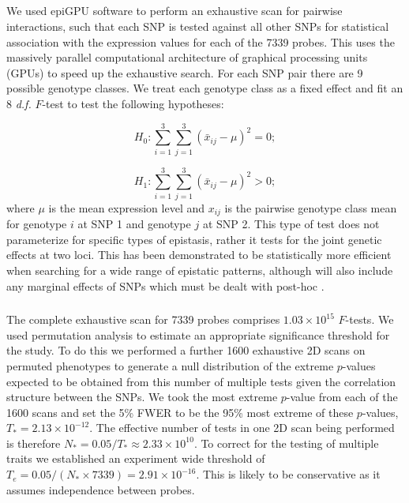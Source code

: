 \documentclass{article}
\providecommand{\DIFadd}[1]{{\protect\color{blue}\uwave{#1}}} %
\providecommand{\DIFaddbegin}{} %
\providecommand{\DIFaddend}{} %
\begin{document}
\DIFaddbegin \subsection{\DIFadd{Two stage search}}

\DIFaddend We used epiGPU \cite{Hemani2011} software to perform an exhaustive scan for pairwise interactions, such that each SNP is tested against all other SNPs for statistical association with the expression values for each of the 7339 probes. This uses the massively parallel computational architecture of graphical processing units (GPUs) to speed up the exhaustive search. For each SNP pair there are 9 possible genotype classes. We treat each genotype class as a fixed effect and fit an 8 \emph{d.f.} $F$-test to test the following hypotheses:

\begin{equation}
H _0 : \sum _{i=1} ^3 \sum _{j=1} ^3 (\bar x _{ij} - \mu) ^2 = 0; 
\end{equation}

\begin{equation}
H _1 : \sum _{i=1} ^3 \sum _{j=1} ^3 (\bar x _{ij} - \mu) ^2 > 0; 
\label{eq:8df}
\end{equation}
where $\mu$ is the mean expression level and $x _{ij}$ is the pairwise genotype class mean for genotype $i$ at SNP 1 and genotype $j$ at SNP 2. This type of test does not parameterize for specific types of epistasis, rather it tests for the joint genetic effects at two loci. This has been demonstrated to be statistically more efficient when searching for a wide range of epistatic patterns, although will also include any marginal effects of SNPs which must be dealt with post-hoc \cite{Hemani2013}.

\DIFaddbegin \subsubsection{\DIFadd{Stage 1}}

\DIFaddend The complete exhaustive scan for 7339 probes comprises $1.03 \times 10^{15}$ $F$-tests. We used permutation analysis to estimate an appropriate significance threshold for the study. To do this we performed a further 1600 exhaustive 2D scans on permuted phenotypes to generate a null distribution of the extreme $p$-values expected to be obtained from this number of multiple tests given the correlation structure between the SNPs. We took the most extreme $p$-value from each of the 1600 scans and set the 5\% FWER to be the 95\% most extreme of these $p$-values, $T_{*} = 2.13 \times 10^{-12}$. The effective number of tests in one 2D scan being performed is therefore $N_{*} = 0.05 / T_{*} \approx 2.33 \times 10^{10}$. To correct for the testing of multiple traits we established an experiment wide threshold of $T_{e} = 0.05 / (N_{*} \times 7339) = 2.91 \times 10^{-16}$. This is likely to be conservative as it assumes independence between probes.
\end{document}
